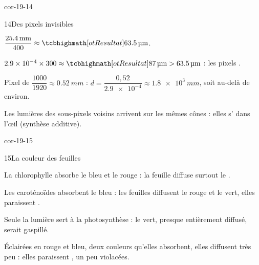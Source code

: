 \begin{blocLivre}{cor-19-14}
\begin{corrige}{14}{Des pixels invisibles}
\begin{questions}
\item $\dfrac{\qty{25,4}{mm}}{400}\approx\res{\qty{63,5}{\micro m}}$.
\item $\num{2,9e-4}\times300\approx\res{\qty{87}{\micro m}}>\qty{63,5}{\micro m}$ : les pixels .
\item Pixel de $\dfrac{1000}{1920}\approx\qty{0,52}{mm}$ : $d=\dfrac{0{,}52}{\num{2,9e-4}}\approx\qty{1,8e3}{mm}$, soit au-delà de  environ.
\item Les lumières des sous-pixels voisins arrivent sur les mêmes cônes : elles s' dans l'œil (synthèse additive).
\end{questions}
\end{corrige}
\end{blocLivre}
\begin{blocLivre}{cor-19-15}
\begin{corrige}{15}{La couleur des feuilles}
\begin{questions}
\item La chlorophylle absorbe le bleu et le rouge : la feuille diffuse surtout le .
\item Les caroténoïdes absorbent le bleu : les feuilles diffusent le rouge et le vert, elles paraissent .
\item Seule la lumière  sert à la photosynthèse : le vert, presque entièrement diffusé, serait gaspillé.
\item Éclairées en rouge et bleu, deux couleurs qu'elles absorbent, elles diffusent très peu : elles paraissent , un peu violacées.
\end{questions}
\end{corrige}
\end{blocLivre}
